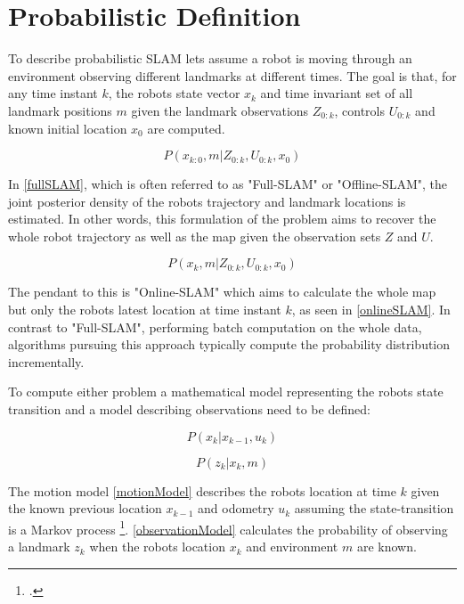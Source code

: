 \section{Probabilistic Definition}
To describe probabilistic SLAM lets assume a robot is moving through an environment observing different landmarks at different times. 
The goal is that, for any time instant $ k $, the robots state vector $ x_{k} $ and time invariant set of all landmark positions $ m $ given the landmark observations $ Z_{0:k}$, controls $ U_{0:k} $ and known initial location $ x_{0} $ are computed.

\begin{equation}\label{fullSLAM}
	P(x_{k:0}, m | Z_{0:k}, U_{0:k}, x_{0})
\end{equation}

In \ref{fullSLAM}, which is often referred to as "Full-SLAM" or "Offline-SLAM", the joint posterior density of the robots trajectory and landmark locations is estimated. In other words, this formulation of the problem aims to recover the whole robot trajectory as well as the map given the observation sets $ Z $ and $ U $. 

\begin{equation}\label{onlineSLAM}
	P(x_{k}, m | Z_{0:k}, U_{0:k}, x_{0})
\end{equation}

The pendant to this is "Online-SLAM" which aims to calculate the whole map but only the robots latest location at time instant $ k $, as seen in \ref{onlineSLAM}. In contrast to "Full-SLAM", performing batch computation on the whole data, algorithms pursuing this approach typically compute the probability distribution incrementally. 

To compute either problem a mathematical model representing the robots state transition and a model describing observations need to be defined:

\begin{equation}\label{motionModel}
	P(x_{k} | x_{k-1}, u_{k})
\end{equation}

\begin{equation}\label{observationModel}
	P(z_{k} | x_{k}, m)
\end{equation}

The motion model \ref{motionModel} describes the robots location at time $ k $ given the known previous location $ x_{k-1} $ and odometry $ u_{k} $ assuming the state-transition is a Markov process \footcite{haeneltMarvoModel2006}.
\ref{observationModel} calculates the probability of observing a landmark $ z_{k} $ when the robots location $ x_{k} $ and environment $ m $ are known.

